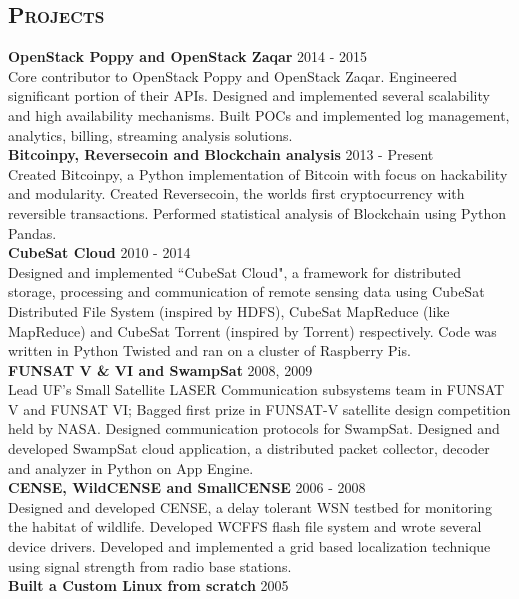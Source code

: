 \begin{resume}
\section{\textsc{Projects}}
\textbf{OpenStack Poppy and OpenStack Zaqar} \hfill 2014 - 2015\\
Core contributor to OpenStack Poppy and OpenStack Zaqar. Engineered significant portion of their APIs. Designed and implemented several scalability and high availability mechanisms. Built POCs and implemented log management, analytics, billing, streaming analysis solutions.\\
\textbf{Bitcoinpy, Reversecoin and Blockchain analysis} \hfill 2013 - Present\\
Created Bitcoinpy, a Python implementation of Bitcoin with focus on hackability and modularity. Created Reversecoin, the worlds first cryptocurrency with reversible transactions. Performed statistical analysis of Blockchain using Python Pandas.\\
\textbf{CubeSat Cloud} \hfill 2010 - 2014 \\
Designed and implemented ``CubeSat Cloud", a framework for distributed storage, processing and communication of remote sensing data using CubeSat Distributed File System (inspired by HDFS), CubeSat MapReduce (like MapReduce) and CubeSat Torrent (inspired by Torrent) respectively. Code was written in Python Twisted and ran on a cluster of Raspberry Pis.\\
\textbf{FUNSAT V \& VI and SwampSat} \hfill 2008, 2009 \\
Lead UF's Small Satellite LASER Communication subsystems team in FUNSAT V and FUNSAT VI; Bagged first prize in FUNSAT-V satellite design competition held by NASA. Designed communication protocols for SwampSat. Designed and developed SwampSat cloud application, a distributed packet collector, decoder and analyzer in Python on App Engine.\\
\textbf{CENSE, WildCENSE and SmallCENSE} \hfill 2006 - 2008\\
Designed and developed CENSE, a delay tolerant WSN testbed for monitoring the habitat of wildlife. Developed WCFFS flash file system and wrote several device drivers. Developed and implemented a grid based localization technique using signal strength from radio base stations.\\
\textbf{Built a Custom Linux from scratch} \hfill 2005



\end{resume}
